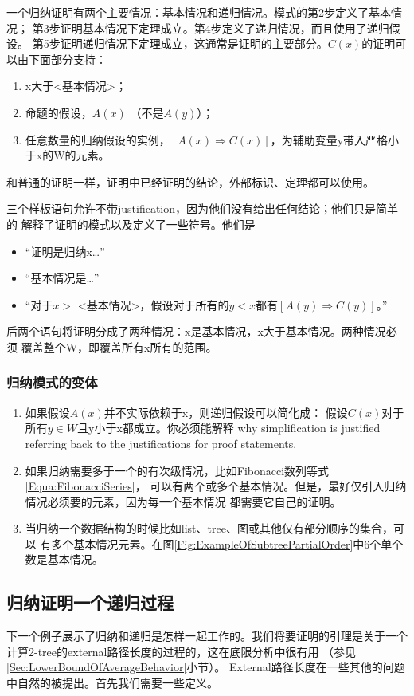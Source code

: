 一个归纳证明有两个主要情况：基本情况和递归情况。模式的第2步定义了基本情况；
第3步证明基本情况下定理成立。第4步定义了递归情况，而且使用了递归假设。
第5步证明递归情况下定理成立，这通常是证明的主要部分。$C(x)$的证明可以由下面部分支持：
\begin{enumerate}
\item x大于<基本情况>；
\item 命题的假设，$A(x)$ （不是$A(y)$）；
\item 任意数量的归纳假设的实例，$[A(x)\Rightarrow C(x)]$，为辅助变量y带入严格小于x的W的元素。
\end{enumerate}
和普通的证明一样，证明中已经证明的结论，外部标识、定理都可以使用。

三个样板语句允许不带justification，因为他们没有给出任何结论；他们只是简单的
解释了证明的模式以及定义了一些符号。他们是
\begin{itemize}
\item “证明是归纳x…”
\item “基本情况是…”
\item “对于$x>$ <基本情况>，假设对于所有的$y<x$都有$[A(y)\Rightarrow C(y)]$。”
\end{itemize}
后两个语句将证明分成了两种情况：x是基本情况，x大于基本情况。两种情况必须
覆盖整个W，即覆盖所有x所有的范围。

\subsubsection{归纳模式的变体}
\begin{enumerate}
\item  如果假设$A(x)$并不实际依赖于x，则递归假设可以简化成：
        假设$C(x)$对于所有$y\in W$且y小于x都成立。你必须能解释
        why simplification is justified referring back to the
        justifications for proof statements.
\item 如果归纳需要多于一个的有次级情况，比如Fibonacci数列等式\ref{Equa:FibonacciSeries}，
        可以有两个或多个基本情况。但是，最好仅引入归纳情况必须要的元素，因为每一个基本情况
        都需要它自己的证明。
\item 当归纳一个数据结构的时候比如list、tree、图或其他仅有部分顺序的集合，可以
        有多个基本情况元素。在图\ref{Fig:ExampleOfSubtreePartialOrder}中6个单个数是基本情况。
\end{enumerate}

\subsection{归纳证明一个递归过程}
下一个例子展示了归纳和递归是怎样一起工作的。我们将要证明的引理是关于一个
计算2-tree的external路径长度的过程的，这在底限分析中很有用
（参见\ref{Sec:LowerBoundOfAverageBehavior}小节）。
External路径长度在一些其他的问题中自然的被提出。首先我们需要一些定义。

